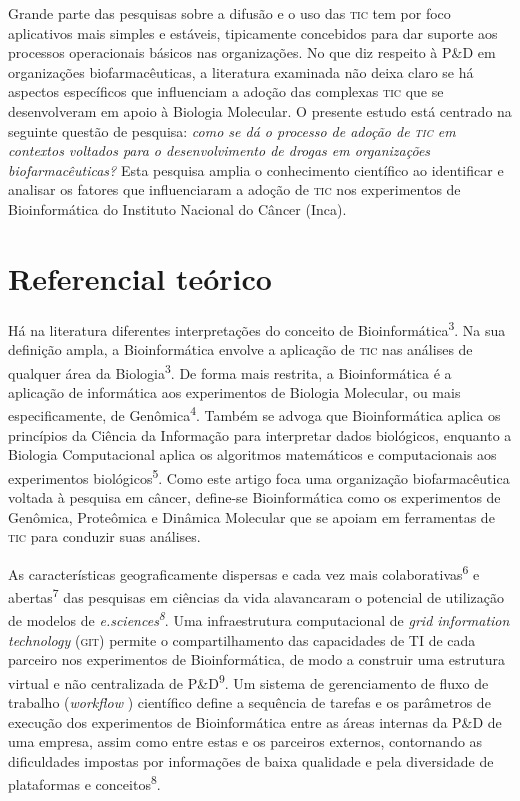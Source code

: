 \documentclass{article}
\begin{document}
Grande parte das pesquisas sobre a difusão e o uso das \textsc{tic} tem por foco
aplicativos mais simples e estáveis, tipicamente concebidos para dar suporte aos
processos operacionais básicos nas organizações. No que diz respeito à P\&D em
organizações biofarmacêuticas, a literatura examinada não deixa claro se há
aspectos específicos que influenciam a adoção das complexas \textsc{tic} que se
desenvolveram em apoio à Biologia Molecular. O presente estudo está centrado na
seguinte questão de pesquisa: \textit{como se dá o processo de adoção de \textsc{tic} em
contextos voltados para o desenvolvimento de drogas em organizações
biofarmacêuticas?}
Esta pesquisa amplia o conhecimento científico ao identificar e analisar os
fatores que influenciaram a adoção de \textsc{tic} nos experimentos de Bioinformática do
Instituto Nacional do Câncer (Inca).

\section{Referencial teórico}

Há na literatura diferentes interpretações do conceito de
Bioinformática\textsuperscript{3}. Na sua definição ampla, a Bioinformática envolve a aplicação de \textsc{tic} nas
análises de qualquer área da Biologia\textsuperscript{3}. De forma mais restrita, a Bioinformática é a aplicação de informática aos
experimentos de Biologia Molecular, ou mais especificamente, de
Genômica\textsuperscript{4}. Também se advoga que Bioinformática aplica os princípios da Ciência da
Informação para interpretar dados biológicos, enquanto a Biologia Computacional
aplica os algoritmos matemáticos e computacionais aos experimentos
biológicos\textsuperscript{5}. Como este artigo foca uma organização biofarmacêutica voltada à pesquisa em
câncer, define-se Bioinformática como os experimentos de Genômica, Proteômica e
Dinâmica Molecular que se apoiam em ferramentas de \textsc{tic} para conduzir suas
análises.

As características geograficamente dispersas e cada vez mais
colaborativas\textsuperscript{6}
e abertas\textsuperscript{7}
das pesquisas em ciências da vida alavancaram o potencial de utilização de
modelos de \textit{e.sciences\textsuperscript{8}}. Uma infraestrutura computacional de \textit{grid information technology}
(\textsc{git}) permite o compartilhamento das capacidades de TI de cada parceiro nos
experimentos de Bioinformática, de modo a construir uma estrutura virtual e não
centralizada de P\&D\textsuperscript{9}. Um sistema de gerenciamento de fluxo de trabalho (\textit{workflow}
) científico define a sequência de tarefas e os parâmetros de execução dos
experimentos de Bioinformática entre as áreas internas da P\&D de uma empresa,
assim como entre estas e os parceiros externos, contornando as dificuldades
impostas por informações de baixa qualidade e pela diversidade de plataformas e
conceitos\textsuperscript{8}.
\end{document}
